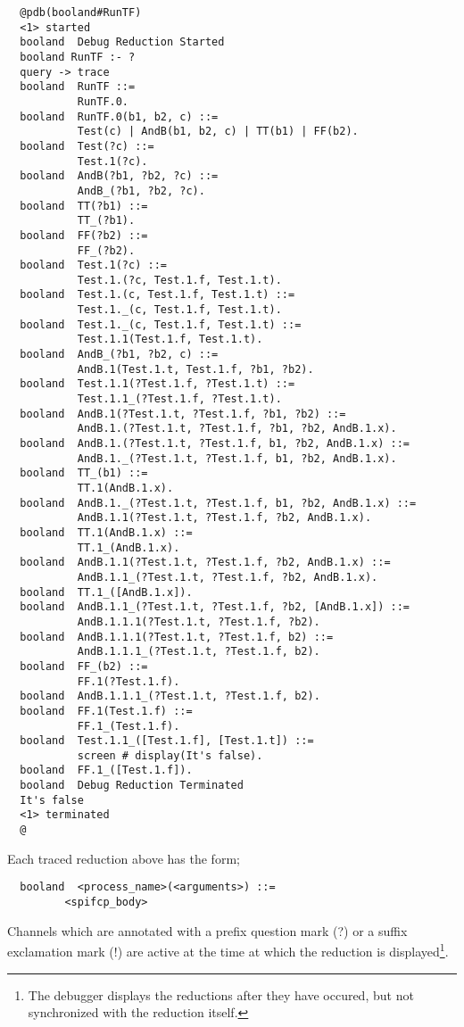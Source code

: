 \documentclass[twoside,10pt]{report}
\begin{document}
\begin{verbatim}
  @pdb(booland#RunTF)
  <1> started
  booland  Debug Reduction Started
  booland RunTF :- ?
  query -> trace
  booland  RunTF ::=
           RunTF.0.
  booland  RunTF.0(b1, b2, c) ::=
           Test(c) | AndB(b1, b2, c) | TT(b1) | FF(b2).
  booland  Test(?c) ::=
           Test.1(?c).
  booland  AndB(?b1, ?b2, ?c) ::=
           AndB_(?b1, ?b2, ?c).
  booland  TT(?b1) ::=
           TT_(?b1).
  booland  FF(?b2) ::=
           FF_(?b2).
  booland  Test.1(?c) ::=
           Test.1.(?c, Test.1.f, Test.1.t).
  booland  Test.1.(c, Test.1.f, Test.1.t) ::=
           Test.1._(c, Test.1.f, Test.1.t).
  booland  Test.1._(c, Test.1.f, Test.1.t) ::=
           Test.1.1(Test.1.f, Test.1.t).
  booland  AndB_(?b1, ?b2, c) ::=
           AndB.1(Test.1.t, Test.1.f, ?b1, ?b2).
  booland  Test.1.1(?Test.1.f, ?Test.1.t) ::=
           Test.1.1_(?Test.1.f, ?Test.1.t).
  booland  AndB.1(?Test.1.t, ?Test.1.f, ?b1, ?b2) ::=
           AndB.1.(?Test.1.t, ?Test.1.f, ?b1, ?b2, AndB.1.x).
  booland  AndB.1.(?Test.1.t, ?Test.1.f, b1, ?b2, AndB.1.x) ::=
           AndB.1._(?Test.1.t, ?Test.1.f, b1, ?b2, AndB.1.x).
  booland  TT_(b1) ::=
           TT.1(AndB.1.x).
  booland  AndB.1._(?Test.1.t, ?Test.1.f, b1, ?b2, AndB.1.x) ::=
           AndB.1.1(?Test.1.t, ?Test.1.f, ?b2, AndB.1.x).
  booland  TT.1(AndB.1.x) ::=
           TT.1_(AndB.1.x).
  booland  AndB.1.1(?Test.1.t, ?Test.1.f, ?b2, AndB.1.x) ::=
           AndB.1.1_(?Test.1.t, ?Test.1.f, ?b2, AndB.1.x).
  booland  TT.1_([AndB.1.x]).
  booland  AndB.1.1_(?Test.1.t, ?Test.1.f, ?b2, [AndB.1.x]) ::=
           AndB.1.1.1(?Test.1.t, ?Test.1.f, ?b2).
  booland  AndB.1.1.1(?Test.1.t, ?Test.1.f, b2) ::=
           AndB.1.1.1_(?Test.1.t, ?Test.1.f, b2).
  booland  FF_(b2) ::=
           FF.1(?Test.1.f).
  booland  AndB.1.1.1_(?Test.1.t, ?Test.1.f, b2).
  booland  FF.1(Test.1.f) ::=
           FF.1_(Test.1.f).
  booland  Test.1.1_([Test.1.f], [Test.1.t]) ::=
           screen # display(It's false).
  booland  FF.1_([Test.1.f]).
  booland  Debug Reduction Terminated
  It's false
  <1> terminated
  @
\end{verbatim}

\noindent
Each traced reduction above has the form;

\begin{verbatim}
  booland  <process_name>(<arguments>) ::=
         <spifcp_body>
\end{verbatim}

\noindent
Channels which are annotated with a prefix question mark (?) or a
suffix exclamation mark (!) are
active at the time at which the reduction is displayed\footnote{
The debugger displays the reductions after they have occured,
but not synchronized with the reduction itself.}.
\end{document}
